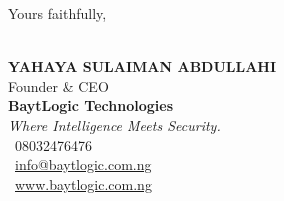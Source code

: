 \documentclass[11pt,a4paper]{article}
\begin{document}
\vspace{25pt}

\noindent Yours faithfully,\\[10pt]
\\[6pt]
\textbf{\large YAHAYA SULAIMAN ABDULLAHI}\\
Founder \& CEO\\
\textbf{BaytLogic Technologies}\\
\textit{Where Intelligence Meets Security.}\\[6pt]
\faPhone*\ 08032476476\\
\faEnvelope\ \href{mailto:info@baytlogic.com.ng}{info@baytlogic.com.ng}\\
\faGlobe\ \href{http://www.baytlogic.com.ng}{www.baytlogic.com.ng}
\end{document}

